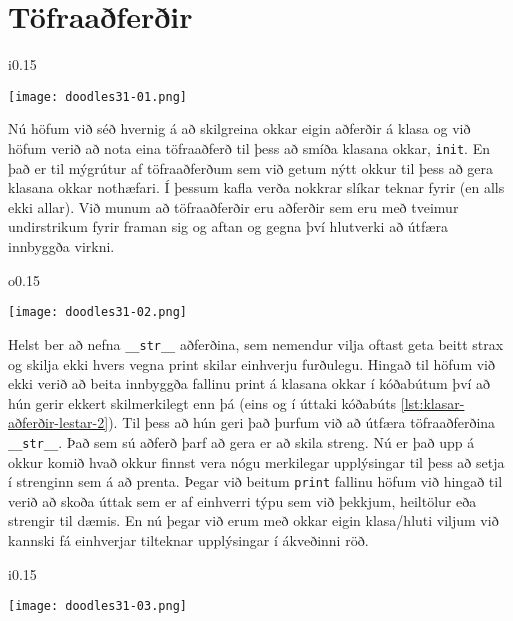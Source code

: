 \section{Töfraaðferðir}\label{uk:klasar-töfra-aðferðir}
\begin{wrapfigure}{i}{0.15\textwidth} %
\begin{center}
	\texttt{[image: doodles31-01.png]}
\end{center}
\end{wrapfigure}
Nú höfum við séð hvernig á að skilgreina okkar eigin aðferðir á klasa og við höfum verið að nota eina töfraaðferð til þess að smíða klasana okkar, \texttt{init}.
En það er til mýgrútur af töfraaðferðum sem við getum nýtt okkur til þess að gera klasana okkar nothæfari.
Í þessum kafla verða nokkrar slíkar teknar fyrir (en alls ekki allar).
Við munum að töfraaðferðir eru aðferðir sem eru með tveimur undirstrikum fyrir framan sig og aftan og gegna því hlutverki að útfæra innbyggða virkni.
\phantom{}
\begin{wrapfigure}{o}{0.15\textwidth} %
	\begin{center}
		\texttt{[image: doodles31-02.png]}
	\end{center}
\end{wrapfigure}

\vspace{10pt}

Helst ber að nefna \texttt{\_\_str\_\_} aðferðina, sem nemendur vilja oftast geta beitt strax og skilja ekki hvers vegna print skilar einhverju furðulegu.
Hingað til höfum við ekki verið að beita innbyggða fallinu print á klasana okkar í kóðabútum því að hún gerir ekkert skilmerkilegt enn þá (eins og í úttaki kóðabúts \ref{lst:klasar-aðferðir-lestar-2}).
Til þess að hún geri það þurfum við að útfæra töfraaðferðina \texttt{\_\_str\_\_}.
Það sem sú aðferð þarf að gera er að skila streng.
Nú er það upp á okkur komið hvað okkur finnst vera nógu merkilegar upplýsingar til þess að setja í strenginn sem á að prenta.
Þegar við beitum \texttt{print} fallinu höfum við hingað til verið að skoða úttak sem er af einhverri týpu sem við þekkjum, heiltölur eða strengir til dæmis.
En nú þegar við erum með okkar eigin klasa/hluti viljum við kannski fá einhverjar tilteknar upplýsingar í ákveðinni röð.


\begin{wrapfigure}{i}{0.15\textwidth} %
	\begin{center}
		\texttt{[image: doodles31-03.png]}
	\end{center}
\end{wrapfigure}

